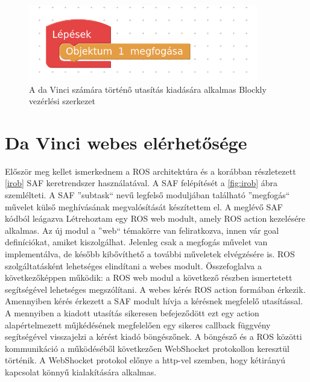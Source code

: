 \documentclass[12pt,a4paper,oneside]{report} %
\begin{document}
\begin{figure}[H]
\centering
\label{fig:davinciblock}
\includegraphics[width=10cm]{davinciblock}
\caption{A da Vinci számára történő utasítás kiadására alkalmas Blockly vezérlési szerkezet }
\end{figure}

\section{Da Vinci webes elérhetősége}
Először meg kellet ismerkednem a ROS architektúra és a korábban részletezett \ref{irob} SAF keretrendszer használatával.
A SAF felépítését a \ref{fig:irob} ábra szemlélteti. A SAF ''subtask`` nevű legfelső moduljában található ''megfogás`` művelet külső meghívásának megvalósítását készítettem el. A meglévő SAF kódból leágazva Létrehoztam egy  ROS web modult, amely ROS action kezelésére alkalmas. Az új modul a ''web`` témakörre van feliratkozva, innen vár goal definíciókat, amiket kiszolgálhat. Jelenleg csak a megfogás művelet van implementálva, de később kibővíthető a további műveletek elvégzésére is. ROS szolgáltatásként lehetséges elindítani a webes modult. Összefoglalva a következőképpen működik: a ROS web modul a következő részben ismertetett  segítségével lehetséges megszólítani. A webes kérés ROS action formában érkezik. Amennyiben kérés érkezett a SAF  modult hívja a kérésnek megfelelő utasítással. A mennyiben a kiadott utasítás sikeresen befejeződött ezt egy action alapértelmezett műjkédésének megfelelően egy sikeres callback függvény segítségével visszajelzi a kérést kiadó böngészőnek. A böngésző és a  ROS közötti kommunikáció a  működéséből következően WebShocket protokollon keresztül történik. A WebShocket protokol előnye a http-vel szemben, hogy kétirányú kapcsolat könnyű kialakítására alkalmas.
\end{document}
